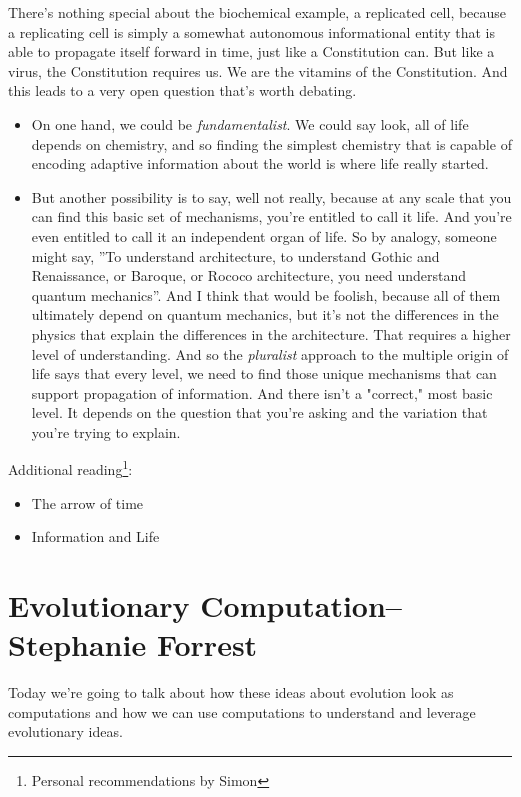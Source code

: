 \documentclass[]{article}
\begin{document}
There's nothing special about the biochemical example, a replicated cell, because a replicating cell is simply a somewhat autonomous informational entity that is able to propagate itself forward in time, just like a Constitution can.
But like a virus, the Constitution requires us. We are the vitamins of the Constitution.
And this leads to a very open question that's worth debating.
\begin{itemize}
	\item  On one hand, we could be \emph{fundamentalist}. We could say look, all of life depends on chemistry, and so finding the simplest chemistry that is capable of encoding adaptive information about the world is where life really started.
	\item But another possibility is to say, well not really, because at any scale that you can find this basic set of mechanisms, you're entitled to call it life. And you're even entitled to call it an independent organ of life. So by analogy, someone might say, ''To understand architecture, to understand Gothic and Renaissance, or Baroque, or Rococo architecture, you need understand quantum mechanics''. And I think that would be foolish, because all of them ultimately depend on quantum mechanics, but it's not the differences in the physics that explain the differences in the architecture. That requires a higher level of understanding. And so the \emph{pluralist} approach to the multiple origin of life says that every level, we need to find those unique mechanisms that can support propagation of information. And there isn't a "correct," most basic level. It depends on the question that you're asking and the variation that you're trying to explain.
\end{itemize}

Additional reading\footnote{Personal recommendations by Simon}:
\begin{itemize}
	\item The arrow of time \cite{rovelli2017time,rovelli2019order,susskind2013time}
	\item Information and Life \cite{friston2013life}
\end{itemize}
	
\section[Evolutionary Computation]{Evolutionary Computation--Stephanie Forrest}

Today we're going to talk about how these ideas about evolution look as computations and how we can use computations to understand and leverage 
evolutionary ideas.
\end{document}
